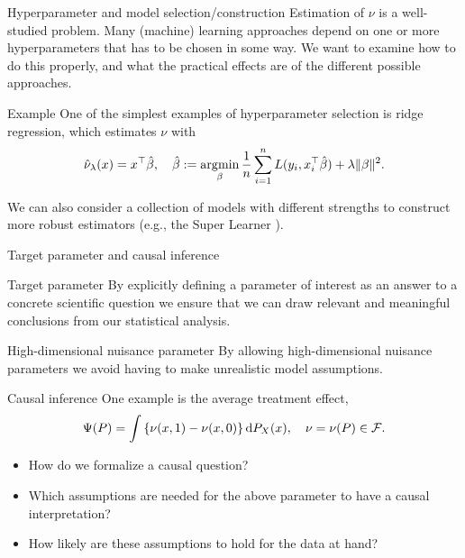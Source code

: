 \documentclass[smaller]{beamer}\usepackage{listings}
\begin{document}
\begin{frame}[label={sec:org1887525}]{Hyperparameter and model selection/construction}
Estimation of \(\nu\) is a well-studied problem. Many (machine) learning approaches depend on one or
more hyperparameters that has to be chosen in some way. We want to examine how to do this properly,
and what the practical effects are of the different possible approaches.

\vfill

\begin{block}{Example}
One of the simplest examples of hyperparameter selection is ridge regression, which estimates \(\nu\)
with
\begin{equation*}
  \hat{\nu}_{\lambda}(x) = x^{\top} \hat{\beta}, \quad
  \hat{\beta} := \operatorname*{\arg\!\min}_{\beta} \frac{1}{n} \sum_{i=1}^{n}L(y_i, x_i^{\top} \hat{\beta}) + \lambda
  \Vert \beta \Vert^2.
\end{equation*}

We can also consider a collection of models with different strengths to construct more robust
estimators (e.g., the Super Learner \cite{HoffmanBlog,van2011targeted}).
\end{block}
\end{frame}

\begin{frame}[label={sec:org8b899da}]{Target parameter and causal inference}
\begin{block}{Target parameter}
By explicitly defining a parameter of interest as an answer to a concrete scientific question we
ensure that we can draw relevant and meaningful conclusions from our statistical analysis.
\end{block}

\begin{block}{High-dimensional nuisance parameter}
By allowing high-dimensional nuisance parameters we avoid having to make unrealistic model
assumptions.
\end{block}

\begin{block}{Causal inference}
One example is the average treatment effect, \[\Psi(P) = \int {\left\{ \nu(x, 1) - \nu(x, 0)
\right\}} \mathop{}\!\mathrm{d} P_X(x), \quad \nu=\nu(P) \in \mathcal{F}. \]

\begin{itemize}
\item How do we formalize a causal question?
\item Which assumptions are needed for the above parameter to have a causal interpretation?
\item How likely are these assumptions to hold for the data at hand?
\end{itemize}
\end{block}
\end{frame}
\end{document}

